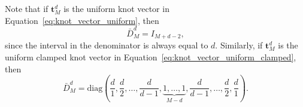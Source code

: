 Note that if $\mathbf{t}_M^d$ is the uniform knot vector in Equation~\eqref{eq:knot_vector_uniform}, then 
\[
\bar{D}_M^d  = I_{M+d-2},
\]
since the interval in the denominator is always equal to $d$.
%
Similarly, if $\mathbf{t}_M^d$ is the uniform clamped knot vector in Equation~\eqref{eq:knot_vector_uniform_clamped}, then 
\[
\bar{D}_M^d = \text{diag}\left(\frac{d}{1}, \frac{d}{2}, \dots, \frac{d}{d-1}, \underbrace{1, \dots, 1}_{M-d}, \frac{d}{d-1}, \dots, \frac{d}{2}, \frac{d}{1}\right).
\]

%

